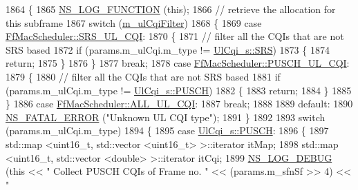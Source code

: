 \begin{DoxyCode}
1864 \{
1865   \hyperlink{log-macros-disabled_8h_a90b90d5bad1f39cb1b64923ea94c0761}{NS\_LOG\_FUNCTION} (\textcolor{keyword}{this});
1866 \textcolor{comment}{// retrieve the allocation for this subframe}
1867   \textcolor{keywordflow}{switch} (\hyperlink{classns3_1_1FfMacScheduler_adae16e66a1c4231da80a1221297442cf}{m\_ulCqiFilter})
1868     \{
1869     \textcolor{keywordflow}{case} \hyperlink{classns3_1_1FfMacScheduler_aa47a9eb25f2c558c825b0be645304a52af2e0df473ba2c8f9cb131cb760591aed}{FfMacScheduler::SRS\_UL\_CQI}:
1870       \{
1871         \textcolor{comment}{// filter all the CQIs that are not SRS based}
1872         \textcolor{keywordflow}{if} (params.m\_ulCqi.m\_type != \hyperlink{structns3_1_1UlCqi__s_aece9e5ebea42eb9ff1744c72c8459b57af4b6dba4243636562c910c4d4761dd7e}{UlCqi\_s::SRS})
1873           \{
1874             \textcolor{keywordflow}{return};
1875           \}
1876       \}
1877       \textcolor{keywordflow}{break};
1878     \textcolor{keywordflow}{case} \hyperlink{classns3_1_1FfMacScheduler_aa47a9eb25f2c558c825b0be645304a52a4a833bc779439b15bd904e1dd8eaa563}{FfMacScheduler::PUSCH\_UL\_CQI}:
1879       \{
1880         \textcolor{comment}{// filter all the CQIs that are not SRS based}
1881         \textcolor{keywordflow}{if} (params.m\_ulCqi.m\_type != \hyperlink{structns3_1_1UlCqi__s_aece9e5ebea42eb9ff1744c72c8459b57a9716b20a3095c473ae3fde1eb5d0bb63}{UlCqi\_s::PUSCH})
1882           \{
1883             \textcolor{keywordflow}{return};
1884           \}
1885       \}
1886     \textcolor{keywordflow}{case} \hyperlink{classns3_1_1FfMacScheduler_aa47a9eb25f2c558c825b0be645304a52a84059a597c72335f0a5963c3efcbda71}{FfMacScheduler::ALL\_UL\_CQI}:
1887       \textcolor{keywordflow}{break};
1888 
1889     \textcolor{keywordflow}{default}:
1890       \hyperlink{group__fatal_ga5131d5e3f75d7d4cbfd706ac456fdc85}{NS\_FATAL\_ERROR} (\textcolor{stringliteral}{"Unknown UL CQI type"});
1891     \}
1892 
1893   \textcolor{keywordflow}{switch} (params.m\_ulCqi.m\_type)
1894     \{
1895     \textcolor{keywordflow}{case} \hyperlink{structns3_1_1UlCqi__s_aece9e5ebea42eb9ff1744c72c8459b57a9716b20a3095c473ae3fde1eb5d0bb63}{UlCqi\_s::PUSCH}:
1896       \{
1897         std::map <uint16\_t, std::vector <uint16\_t> >::iterator itMap;
1898         std::map <uint16\_t, std::vector <double> >::iterator itCqi;
1899         \hyperlink{group__logging_ga413f1886406d49f59a6a0a89b77b4d0a}{NS\_LOG\_DEBUG} (\textcolor{keyword}{this} << \textcolor{stringliteral}{" Collect PUSCH CQIs of Frame no. "} << (params.m\_sfnSf >> 4) << \textcolor{stringliteral}{"
}
\end{DoxyCode}
